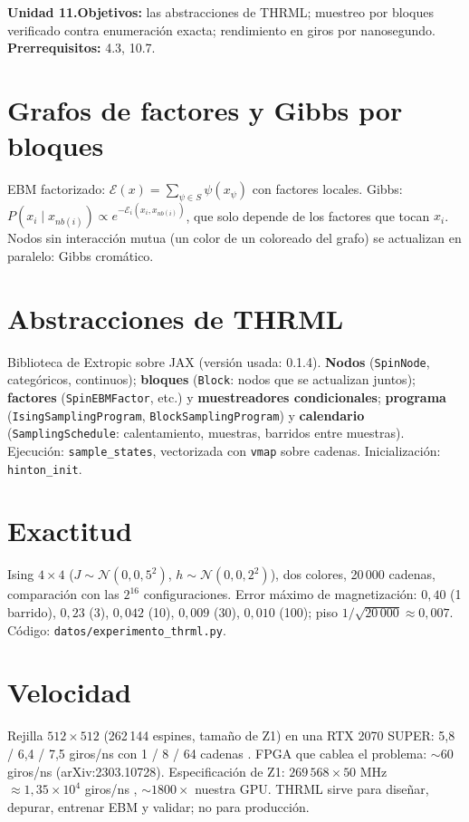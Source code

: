 \documentclass[11pt,a4paper]{article}
\begin{document}

\noindent\textbf{Unidad 11.}\quad\textbf{Objetivos:} las abstracciones de THRML; muestreo por bloques verificado contra enumeración exacta; rendimiento en giros por
nanosegundo.
\textbf{Prerrequisitos:} 4.3, 10.7.

\section{Grafos de factores y Gibbs por bloques}
EBM factorizado: $\mathcal E(x)=\sum_{\psi\in S}\psi(x_\psi)$ con factores locales. Gibbs: $P(x_i\mid x_{nb(i)})\propto e^{-\mathcal E_i(x_i,x_{nb(i)})}$, que solo depende de los
factores que tocan $x_i$. Nodos sin interacción mutua (un color de un coloreado del grafo) se actualizan en paralelo: Gibbs cromático.

\section{Abstracciones de THRML}
Biblioteca de Extropic sobre JAX (versión usada: 0.1.4). \textbf{Nodos} (\texttt{SpinNode}, categóricos, continuos); \textbf{bloques} (\texttt{Block}: nodos que se actualizan
juntos); \textbf{factores} (\texttt{SpinEBMFactor}, etc.) y \textbf{muestreadores condicionales}; \textbf{programa} (\texttt{IsingSamplingProgram},
\texttt{BlockSamplingProgram}) y \textbf{calendario} (\texttt{SamplingSchedule}: calentamiento, muestras, barridos entre muestras). Ejecución: \texttt{sample\_states},
vectorizada con \texttt{vmap} sobre cadenas. Inicialización: \texttt{hinton\_init}.

\section{Exactitud \evS}
Ising $4\times4$ ($J\sim\mathcal N(0,0{,}5^2)$, $h\sim\mathcal N(0,0{,}2^2)$), dos colores, 20\,000 cadenas, comparación con las $2^{16}$ configuraciones. Error máximo de
magnetización: $0{,}40$ (1 barrido), $0{,}23$ (3), $0{,}042$ (10), $0{,}009$ (30), $0{,}010$ (100); piso $1/\sqrt{20\,000}\approx0{,}007$. Código:
\texttt{datos/experimento\_thrml.py}.

\section{Velocidad}
Rejilla $512\times512$ (262\,144 espines, tamaño de Z1) en una RTX 2070 SUPER: 5{,}8 / 6{,}4 / 7{,}5 giros/ns con 1 / 8 / 64 cadenas \evS. FPGA que cablea el problema:
$\sim60$ giros/ns (arXiv:2303.10728). Especificación de Z1: $269\,568\times50$ MHz $\approx1{,}35\times10^4$ giros/ns \evP, $\sim1800\times$ nuestra GPU. THRML sirve para
diseñar, depurar, entrenar EBM y validar; no para producción.
\end{document}
